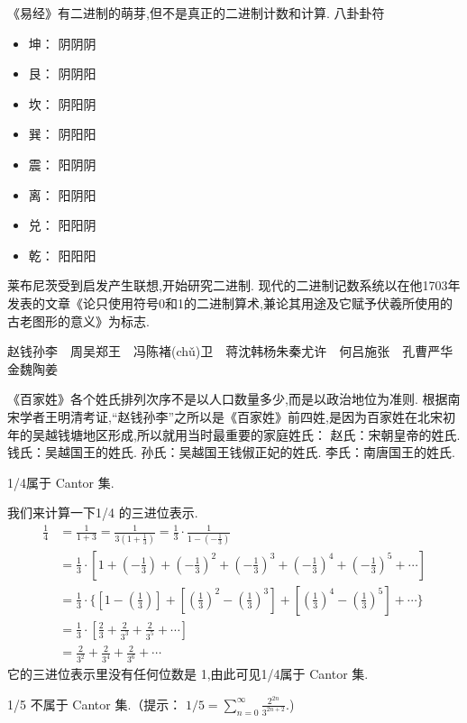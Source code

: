 \documentclass[main.tex]{subfiles}
\begin{document}
《易经》有二进制的萌芽,但不是真正的二进制计数和计算.
八卦卦符
\begin{itemize}
\item 坤： 阴阴阴
\item 艮： 阴阴阳
\item 坎： 阴阳阴
\item 巽： 阴阳阳
\item 震： 阳阴阴
\item 离： 阳阴阳
\item 兑： 阳阳阴
\item 乾： 阳阳阳
\end{itemize}

莱布尼茨受到启发产生联想,开始研究二进制.
现代的二进制记数系统以在他1703年发表的文章《论只使用符号0和1的二进制算术,兼论其用途及它赋予伏羲所使用的古老图形的意义》为标志.



赵钱孙李　周吴郑王　冯陈褚(chǔ)卫　蒋沈韩杨朱秦尤许　何吕施张　孔曹严华　金魏陶姜

《百家姓》各个姓氏排列次序不是以人口数量多少,而是以政治地位为准则.
根据南宋学者王明清考证,“赵钱孙李”之所以是《百家姓》前四姓,是因为百家姓在北宋初年的吴越钱塘地区形成,所以就用当时最重要的家庭姓氏：
赵氏：宋朝皇帝的姓氏.
钱氏：吴越国王的姓氏.
孙氏：吴越国王钱俶正妃的姓氏.
李氏：南唐国王的姓氏.

\begin{example}
	1/4属于 Cantor 集.
\end{example}
我们来计算一下1/4 的三进位表示.
\begin{align*}
\frac{1}{4} &= \frac{1}{1+3} = \frac{1}{3(1+ \frac{1}{3})} 
  = \frac{1}{3} \cdot \frac{1}{1 - (- \frac{1}{3})} \\
  &	= \frac{1}{3} \cdot \left[ 
1 + \left(- \frac{1}{3}\right)
+  \left(- \frac{1}{3}\right)^2 + \left(- \frac{1}{3}\right)^3 
+ \left(- \frac{1}{3}\right)^4   +\left(- \frac{1}{3}\right)^5  +\cdots\right] \\
  &	= \frac{1}{3} \cdot\Big\{ \left[ 
1 - \left( \frac{1}{3}\right)\right]
+ \left[  \left(\frac{1}{3}\right)^2 - \left(\frac{1}{3}\right)^3 \right]
+ \left[ \left(\frac{1}{3}\right)^4   -\left(\frac{1}{3}\right)^5 \right] +\cdots\Big\}\\
  &	= \frac{1}{3} \cdot \left[ 
 \frac{2}{3}+ \frac{2}{3^3}+ \frac{2}{3^5}+\cdots\right] \\
&=  \frac{2}{3^2}+ \frac{2}{3^4}+ \frac{2}{3^6}+\cdots
\end{align*}
\noindent
它的三进位表示里没有任何位数是 1,由此可见1/4属于 Cantor 集.

\begin{Exercises}
	
	\item 1/5 不属于 Cantor 集.（提示：
	$1/5 = \sum_{n = 0}^\infty\frac{2^{2n}}{3^{2n+2}}$.)
	
	
\end{Exercises}
\end{document}
